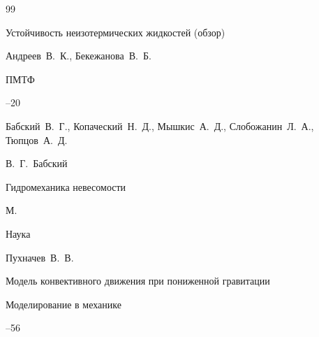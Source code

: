 \begin{thebibliography}{99}












\paper Устойчивость неизотермических жидкостей (обзор) 

\by Андреев~В.~К., Бекежанова~В.~Б.

\jour ПМТФ




--20









\by Бабский~В.~Г., Копаческий~Н.~Д., Мышкис~А.~Д., Слобожанин~Л.~А.,  Тюпцов~А.~Д. 

\ed В.~Г.~Бабский

\book Гидромеханика невесомости

\publaddr М.

\publ Наука








\by Пухначев~В.~В.

\paper Модель конвективного движения при пониженной гравитации

\jour Моделирование в механике




--56





\end{thebibliography}

